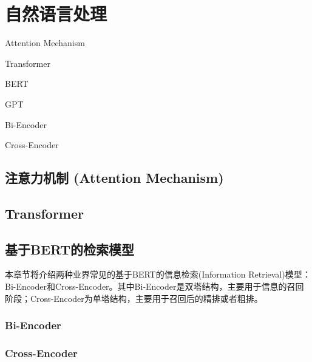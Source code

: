 \chapter{自然语言处理}
\begin{introduction}
  \item Attention Mechanism
  \item Transformer
  \item BERT
  \item GPT
  \item Bi-Encoder
  \item Cross-Encoder
\end{introduction}

\section{注意力机制 (Attention Mechanism)}

\section{Transformer}

\section{基于BERT的检索模型}

本章节将介绍两种业界常见的基于BERT的信息检索(Information Retrieval)模型：Bi-Encoder和Cross-Encoder。其中Bi-Encoder是双塔结构，主要用于信息的召回阶段；Cross-Encoder为单塔结构，主要用于召回后的精排或者粗排。

\subsection{Bi-Encoder}

\subsection{Cross-Encoder}
